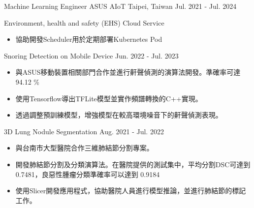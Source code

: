 

\begin{cventries}


  \cventry
    {Machine Learning Engineer} %
    {ASUS AIoT} %
    {Taipei, Taiwan} %
    {Jul. 2021 - Jul. 2024} %
    {
      \begin{cvitems} %
        \item {Environment, health and safety (EHS) Cloud Service}
        \begin{itemize}
            \item 協助開發Scheduler用於定期部署Kubernetes Pod
        \end{itemize}
        \item Snoring Detection on Mobile Device \hfill Jun. 2022 - Jul. 2023
        \begin{itemize}
            \item 與ASUS移動裝置相關部門合作並進行鼾聲偵測的演算法開發。準確率可達94.12 \%
            \item 使用Tensorflow導出TFLite模型並實作頻譜轉換的C++實現。
            \item 透過調整預訓練模型，增強模型在較高環境噪音下的鼾聲偵測表現。
        \end{itemize}
        \item 3D Lung Nodule Segmentation \hfill Aug. 2021 - Jul. 2022
        \begin{itemize}
            \item 與台南市大型醫院合作三維肺結節分割專案。
            \item 開發肺結節分割及分類演算法。在醫院提供的測試集中，平均分割DSC可達到 0.7481，良惡性腫瘤分類準確率可以達到 0.9184
            \item 使用Slicer開發應用程式，協助醫院人員進行模型推論，並進行肺結節的標記工作。
        \end{itemize}
      \end{cvitems}
    }


\end{cventries}
